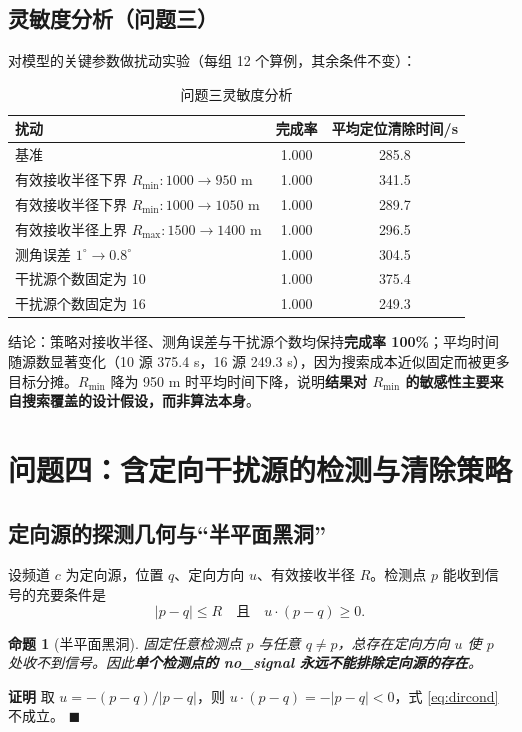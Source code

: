 \documentclass{cumcmthesis}
\newtheorem{proposition}{\heiti 命题}
\newenvironment{pf}{\par\noindent\textbf{证明}\quad}{\hfill$\blacksquare$\par}
\begin{document}
\subsection{灵敏度分析（问题三）}

对模型的关键参数做扰动实验（每组 12 个算例，其余条件不变）：

\begin{table}[H]
\centering
\caption{问题三灵敏度分析}
\label{tab:q3sens}
\begin{tabular}{lcc}
\toprule
扰动 & 完成率 & 平均定位清除时间/s\\
\midrule
基准 & 1.000 & 285.8\\
有效接收半径下界 $R_{\min}:1000\to950$ m & 1.000 & 341.5\\
有效接收半径下界 $R_{\min}:1000\to1050$ m & 1.000 & 289.7\\
有效接收半径上界 $R_{\max}:1500\to1400$ m & 1.000 & 296.5\\
测角误差 $1^{\circ}\to0.8^{\circ}$ & 1.000 & 304.5\\
干扰源个数固定为 10 & 1.000 & 375.4\\
干扰源个数固定为 16 & 1.000 & 249.3\\
\bottomrule
\end{tabular}
\end{table}

结论：策略对接收半径、测角误差与干扰源个数均保持\textbf{完成率 100\%}；平均时间随源数显著变化（10 源 375.4 s，16 源 249.3 s），因为搜索成本近似固定而被更多目标分摊。$R_{\min}$ 降为 950 m 时平均时间下降，说明\textbf{结果对 $R_{\min}$ 的敏感性主要来自搜索覆盖的设计假设，而非算法本身}。

\section{问题四：含定向干扰源的检测与清除策略}

\subsection{定向源的探测几何与“半平面黑洞”}

设频道 $c$ 为定向源，位置 $q$、定向方向 $u$、有效接收半径 $R$。检测点 $p$ 能收到信号的充要条件是
\begin{equation}
|p-q|\le R\quad\text{且}\quad u\cdot(p-q)\ge0 .
\label{eq:dircond}
\end{equation}

\begin{proposition}[半平面黑洞]\label{prop:blackhole}
固定任意检测点 $p$ 与任意 $q\ne p$，总存在定向方向 $u$ 使 $p$ 处收不到信号。因此\textbf{单个检测点的 no\_signal 永远不能排除定向源的存在}。
\end{proposition}
\begin{pf}
取 $u=-(p-q)/|p-q|$，则 $u\cdot(p-q)=-|p-q|<0$，式 \eqref{eq:dircond} 不成立。
\end{pf}
\end{document}
